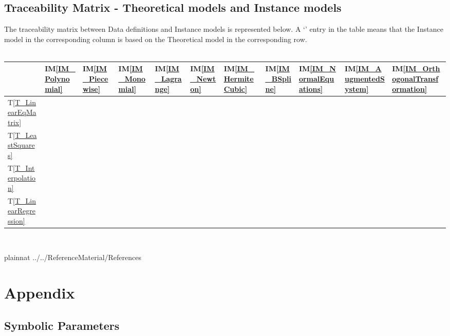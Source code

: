 \documentclass[12pt]{article}
\newcommand{\tref}[1]{T\ref{#1}}
\newcommand{\iref}[1]{IM\ref{#1}}
\begin{document}
\subsection{Traceability Matrix - Theoretical models and Instance models}
The traceability matrix between Data definitions and Instance models is represented below. A `\checkmark' entry in the table means that the Instance model in the corresponding column is based on the Theoretical model in the corresponding row.\\
~\newline
\begin{tabular}{|p{1.3cm}|p{1cm}|p{1cm}|p{1cm}|p{1cm}|p{1cm}|p{1cm}|p{1cm}|p{1cm}|p{1cm}|p{1cm}|}
	
	\hline
	&\iref{IM_Polynomial}  & \iref{IM_Piecewise} & \iref{IM_Monomial} & \iref{IM_Lagrange} & \iref{IM_Newton} & \iref{IM_HermiteCubic}  & \iref{IM_BSpline} & \iref{IM_NormalEquations} & \iref{IM_AugmentedSystem} & \iref{IM_OrthogonalTransformation}\\
	\hline
	\tref{T_LinearEqMatrix} &  &   & \checkmark  & \checkmark & \checkmark  & \checkmark    &  & \checkmark & \checkmark & \checkmark \\
	\hline
	\tref{T_LeastSquares} &  &   &   &   &   &    &  & \checkmark & \checkmark & \checkmark \\
	\hline
	\tref{T_Interpolation} & \checkmark & \checkmark  & \checkmark  & \checkmark  & \checkmark  & \checkmark   & \checkmark & & & \\
	\hline
	\tref{T_LinearRegression} &  &   &   &   &   &  &  & \checkmark & \checkmark & \checkmark  \\
	\hline
\end{tabular}\\


\newpage

 {plainnat}
 {../../ReferenceMaterial/References}

\newpage

\section{Appendix}



\subsection{Symbolic Parameters}

\end{document}
